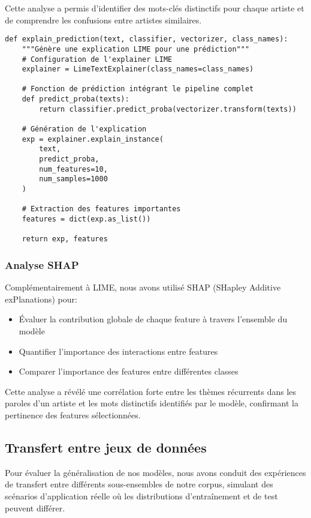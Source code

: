 \documentclass[a4paper,11pt]{article}
\begin{document}
Cette analyse a permis d'identifier des mots-clés distinctifs pour chaque artiste et de comprendre les confusions entre artistes similaires.

\begin{lstlisting}[caption={Implémentation de l'analyse LIME}, label=lst:lime]
def explain_prediction(text, classifier, vectorizer, class_names):
    """Génère une explication LIME pour une prédiction"""
    # Configuration de l'explainer LIME
    explainer = LimeTextExplainer(class_names=class_names)
    
    # Fonction de prédiction intégrant le pipeline complet
    def predict_proba(texts):
        return classifier.predict_proba(vectorizer.transform(texts))
    
    # Génération de l'explication
    exp = explainer.explain_instance(
        text,
        predict_proba,
        num_features=10,
        num_samples=1000
    )
    
    # Extraction des features importantes
    features = dict(exp.as_list())
    
    return exp, features
\end{lstlisting}

\subsubsection{Analyse SHAP}
Complémentairement à LIME, nous avons utilisé SHAP (SHapley Additive exPlanations) pour:
\begin{itemize}
    \item Évaluer la contribution globale de chaque feature à travers l'ensemble du modèle
    \item Quantifier l'importance des interactions entre features
    \item Comparer l'importance des features entre différentes classes
\end{itemize}

Cette analyse a révélé une corrélation forte entre les thèmes récurrents dans les paroles d'un artiste et les mots distinctifs identifiés par le modèle, confirmant la pertinence des features sélectionnées.

\subsection{Transfert entre jeux de données}
Pour évaluer la généralisation de nos modèles, nous avons conduit des expériences de transfert entre différents sous-ensembles de notre corpus, simulant des scénarios d'application réelle où les distributions d'entraînement et de test peuvent différer.
\end{document}
